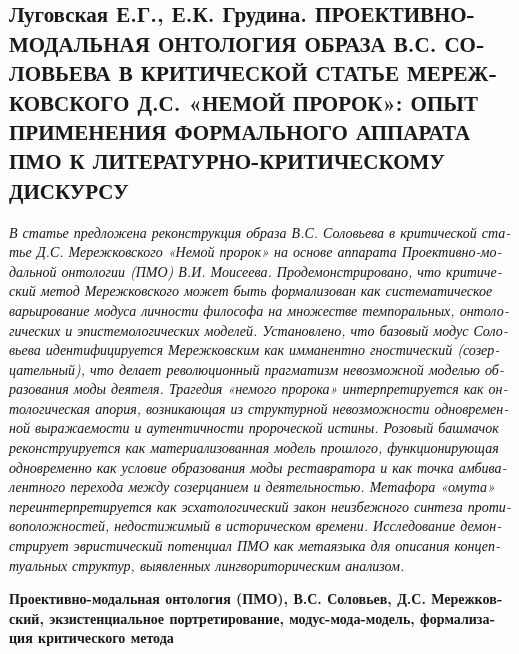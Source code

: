     \begin{russian}

    \subsection{\texorpdfstring{\textbf{Луговская Е.Г., Е.К. Грудина. ПРОЕКТИВНО-МОДАЛЬНАЯ ОНТОЛОГИЯ ОБРАЗА В.С. СОЛОВЬЕВА В КРИТИЧЕСКОЙ СТАТЬЕ МЕРЕЖКОВСКОГО Д.С. «НЕМОЙ ПРОРОК»: ОПЫТ ПРИМЕНЕНИЯ ФОРМАЛЬНОГО АППАРАТА ПМО К ЛИТЕРАТУРНО-КРИТИЧЕСКОМУ ДИСКУРСУ}}{Луговская Е.Г., Е.К. Грудина. ПРОЕКТИВНО-МОДАЛЬНАЯ ОНТОЛОГИЯ ОБРАЗА В.С. СОЛОВЬЕВА В КРИТИЧЕСКОЙ СТАТЬЕ МЕРЕЖКОВСКОГО Д.С. «НЕМОЙ ПРОРОК»: ОПЫТ ПРИМЕНЕНИЯ ФОРМАЛЬНОГО АППАРАТА ПМО К ЛИТЕРАТУРНО-КРИТИЧЕСКОМУ ДИСКУРСУ}}
    \label{subsec:lugowska-ru}

    \textit{В статье предложена реконструкция образа В.С. Соловьева в критической статье Д.С. Мережковского «Немой пророк» на основе аппарата Проективно-модальной онтологии (ПМО) В.И. Моисеева. Продемонстрировано, что критический метод Мережковского может быть формализован как систематическое варьирование модуса личности философа на множестве темпоральных, онтологических и эпистемологических моделей. Установлено, что базовый модус Соловьева идентифицируется Мережковским как имманентно гностический (созерцательный), что делает революционный прагматизм невозможной моделью образования моды деятеля. Трагедия «немого пророка» интерпретируется как онтологическая апория, возникающая из структурной невозможности одновременной выражаемости и аутентичности пророческой истины. Розовый башмачок реконструируется как материализованная модель прошлого, функционирующая одновременно как условие образования моды реставратора и как точка амбивалентного перехода между созерцанием и деятельностью. Метафора «омута» переинтерпретируется как эсхатологический закон неизбежного синтеза противоположностей, недостижимый в историческом времени. Исследование демонстрирует эвристический потенциал ПМО как метаязыка для описания концептуальных структур, выявленных лингвориторическим анализом.}

    \textbf{Проективно-модальная онтология (ПМО), В.С. Соловьев, Д.С. Мережковский, экзистенциальное портретирование, модус-мода-модель, формализация критического метода}


\end{russian}
